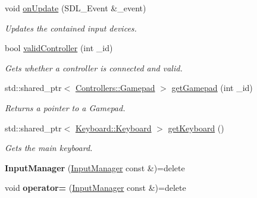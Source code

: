 \begin{DoxyCompactItemize}
\item 
void \hyperlink{class_cookie_eng_1_1_input_1_1_input_manager_ab76d5635bce758f681129ea0cd4afb36}{on\+Update} (S\+D\+L\+\_\+\+Event \&\+\_\+event)
\begin{DoxyCompactList}\small\item\em Updates the contained input devices. \end{DoxyCompactList}\item 
bool \hyperlink{class_cookie_eng_1_1_input_1_1_input_manager_aec78aafcc64f05a3e4eb094e7bb690a6}{valid\+Controller} (int \+\_\+id)
\begin{DoxyCompactList}\small\item\em Gets whether a controller is connected and valid. \end{DoxyCompactList}\item 
std\+::shared\+\_\+ptr$<$ \hyperlink{class_cookie_eng_1_1_input_1_1_controllers_1_1_gamepad}{Controllers\+::\+Gamepad} $>$ \hyperlink{class_cookie_eng_1_1_input_1_1_input_manager_a0a5ffdaf3c5293f4c18f3808e46f5369}{get\+Gamepad} (int \+\_\+id)
\begin{DoxyCompactList}\small\item\em Returns a pointer to a Gamepad. \end{DoxyCompactList}\item 
std\+::shared\+\_\+ptr$<$ \hyperlink{class_cookie_eng_1_1_input_1_1_keyboard_1_1_keyboard}{Keyboard\+::\+Keyboard} $>$ \hyperlink{class_cookie_eng_1_1_input_1_1_input_manager_afc8c29f4a07a98ea6599e5f421115361}{get\+Keyboard} ()
\begin{DoxyCompactList}\small\item\em Gets the main keyboard. \end{DoxyCompactList}\item 
\mbox{\label{class_cookie_eng_1_1_input_1_1_input_manager_acd6ce668320f6c5b26e49dee84124ef3}} 
{\bfseries Input\+Manager} (\hyperlink{class_cookie_eng_1_1_input_1_1_input_manager}{Input\+Manager} const \&)=delete
\item 
\mbox{\label{class_cookie_eng_1_1_input_1_1_input_manager_abb6e65e5f51871ef3811ef0b709c5e5b}} 
void {\bfseries operator=} (\hyperlink{class_cookie_eng_1_1_input_1_1_input_manager}{Input\+Manager} const \&)=delete
\end{DoxyCompactItemize}
